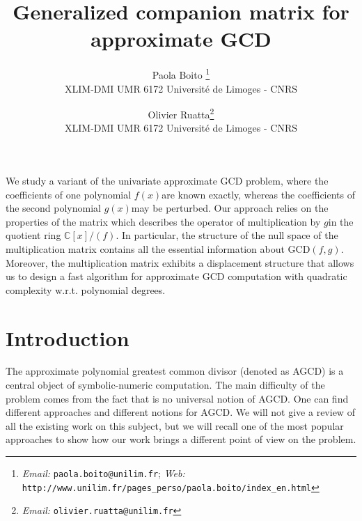 \documentclass{article}
\newcommand{\email}[1]{{\textit{Email:} \texttt{#1}}}
\newcommand{\homepage}[1]{{\textit{Web:} \texttt{#1}}}
\begin{document}
\title{Generalized companion matrix for approximate GCD}\author{Paola
Boito \thanks{\email{paola.boito@unilim.fr};
\homepage{http://www.unilim.fr/pages\_perso/paola.boito/index\_en.html}}\\
XLIM-DMI UMR 6172 Universit\'e de Limoges - CNRS \\  \and Olivier
Ruatta\thanks{\email{olivier.ruatta@unilim.fr}}\\
XLIM-DMI UMR 6172 Universit\'e de Limoges - CNRS}\maketitle



{\small{We study a variant of the univariate approximate GCD problem, where
the coefficients of one polynomial $f (x)$are known exactly, whereas the
coefficients of the second polynomial $g (x)$may be perturbed. Our approach
relies on the properties of the matrix which describes the operator of
multiplication by $g$in the quotient ring $\mathbb{C}[x] / (f)$. In
particular, the structure of the null space of the multiplication matrix
contains all the essential information about GCD$(f, g)$. Moreover, the
multiplication matrix exhibits a displacement structure that allows us to
design a fast algorithm for approximate GCD computation with quadratic
complexity w.r.t. polynomial degrees.}}

\section{Introduction\label{intro}}


The approximate polynomial greatest common divisor (denoted as AGCD) is a
central object of symbolic-numeric computation. The main difficulty of the
problem comes from the fact that is no universal notion of AGCD. One can find
different approaches and different notions for AGCD. We will not give a review
of all the existing work on this subject, but we will recall one of the most
popular approaches to show how our work brings a different point of view on
the problem.
\end{document}
